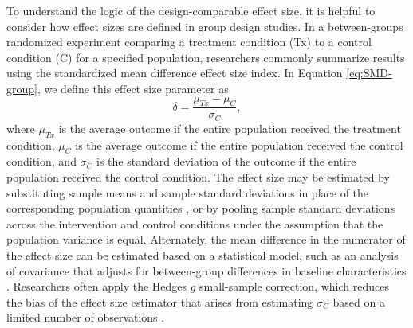 \documentclass[
]{book}
\begin{document}
To understand the logic of the design-comparable effect size, it is helpful to consider how effect sizes are defined in group design studies. In a between-groups randomized experiment comparing a treatment condition (Tx) to a control condition (C) for a specified population, researchers commonly summarize results using the standardized mean difference effect size index. In Equation \eqref{eq:SMD-group}, we define this effect size parameter as
\begin{equation}
\label{eq:SMD-group}
\delta = \frac{\mu_{Tx} - \mu_C}{\sigma_C},
\end{equation}
where \(\mu_{Tx}\) is the average outcome if the entire population received the treatment condition, \(\mu_C\) is the average outcome if the entire population received the control condition, and \(\sigma_C\) is the standard deviation of the outcome if the entire population received the control condition.
The effect size may be estimated by substituting sample means and sample standard deviations in place of the corresponding population quantities \citep{Borenstein2009effect}, or by pooling sample standard deviations across the intervention and control conditions under the assumption that the population variance is equal. Alternately, the mean difference in the numerator of the effect size can be estimated based on a statistical model, such as an analysis of covariance that adjusts for between-group differences in baseline characteristics \citep{taylor2022Promoting}. Researchers often apply the Hedges \(g\) small-sample correction, which reduces the bias of the effect size estimator that arises from estimating \(\sigma_C\) based on a limited number of observations \citep{Hedges1981distribution}.
\end{document}
